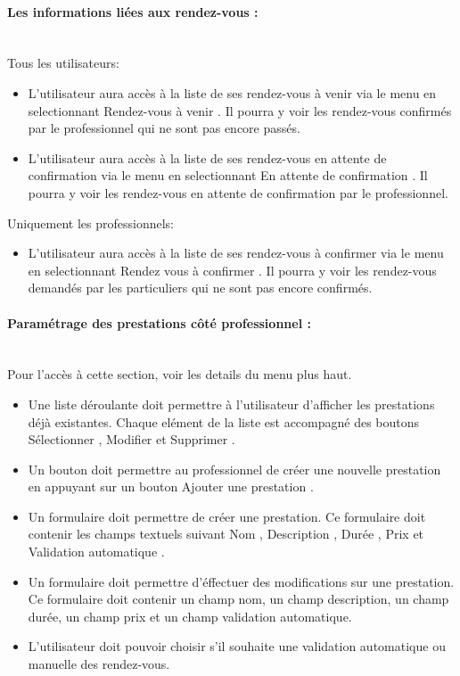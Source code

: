 \documentclass{article}
\begin{document}
\paragraph{Les informations liées aux rendez-vous :}
~~\\Tous les utilisateurs:
\begin{itemize}
\item L'utilisateur aura accès à la liste de ses rendez-vous à venir via le menu en selectionnant \og Rendez-vous à venir \fg{}.
Il pourra y voir les rendez-vous confirmés par le professionnel qui ne sont pas encore passés.

\item L'utilisateur aura accès à la liste de ses rendez-vous en attente de confirmation via le menu en selectionnant \og En attente de confirmation \fg{}.
Il pourra y voir les rendez-vous en attente de confirmation par le professionnel.


\end{itemize}
Uniquement les professionnels:
\begin{itemize}
\item L'utilisateur aura accès à la liste de ses rendez-vous à confirmer via le menu en selectionnant \og Rendez vous à confirmer \fg{}.
Il pourra y voir les rendez-vous demandés par les particuliers qui ne sont pas encore confirmés.

\end{itemize}

\paragraph{Paramétrage des prestations côté professionnel :}
~~\\Pour l'accès à cette section, voir les details du menu plus haut.
\begin{itemize}
\item Une liste déroulante doit permettre à l'utilisateur d'afficher
  les prestations déjà existantes. Chaque elément de la liste est
  accompagné des boutons \og Sélectionner \fg{}, \og Modifier \fg{} et
  \og Supprimer \fg{}.

\item Un bouton doit permettre au professionnel de créer une nouvelle
  prestation en appuyant sur un bouton \og Ajouter une prestation
  \fg{}.

\item Un formulaire doit permettre de créer une prestation. Ce
  formulaire doit contenir les champs textuels suivant \og Nom \fg{}, \og Description
 \fg{},  \og Durée \fg{}, \og Prix \fg{} et \og Validation automatique \fg{}.


\item Un formulaire doit permettre d'éffectuer des modifications sur
  une prestation. Ce formulaire doit contenir un champ nom, un champ description, un champ
  durée, un champ prix et un champ validation automatique.
\item L'utilisateur doit pouvoir choisir s'il souhaite une validation automatique ou manuelle des rendez-vous.
\end{itemize}
\end{document}

